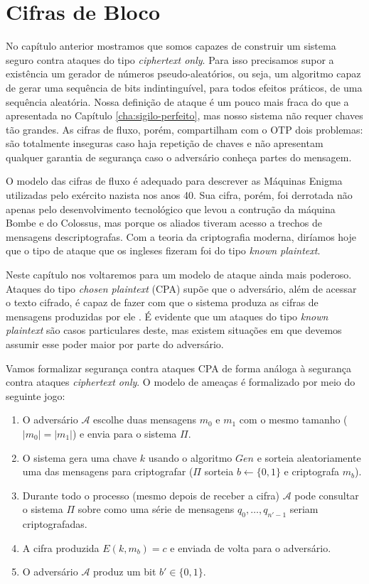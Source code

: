 \chapter{Cifras de Bloco}
\label{cha:cifras-de-bloco}

No capítulo anterior mostramos que somos capazes de construir um sistema seguro contra ataques do tipo {\em ciphertext only}.
Para isso precisamos supor a existência um gerador de números pseudo-aleatórios, ou seja, um algoritmo capaz de gerar uma sequência de bits indintinguível, para todos efeitos práticos, de uma sequência aleatória.
Nossa definição de ataque é um pouco mais fraca do que a apresentada no Capítulo \ref{cha:sigilo-perfeito}, mas nosso sistema não requer chaves tão grandes.
As cifras de fluxo, porém, compartilham com o OTP dois problemas: são totalmente inseguras caso haja repetição de chaves e não apresentam qualquer garantia de segurança caso o adversário conheça partes do mensagem.

O modelo das cifras de fluxo é adequado para descrever as Máquinas Enigma utilizadas pelo exército nazista nos anos 40.
Sua cifra, porém, foi derrotada não apenas pelo desenvolvimento tecnológico que levou a contrução da máquina Bombe e do Colossus, mas porque os aliados tiveram acesso a trechos de mensagens descriptografas.
Com a teoria da criptografia moderna, diríamos hoje que o tipo de ataque que os ingleses fizeram foi do tipo {\em known plaintext}.

Neste capítulo nos voltaremos para um modelo de ataque ainda mais poderoso.
Ataques do tipo {\em chosen plaintext} (CPA) supõe que o adversário, além de acessar o texto cifrado, é capaz de fazer com que o sistema produza as cifras de mensagens produzidas por ele \cite{Bellare97}.
É evidente que um ataques do tipo {\em known plaintext} são casos particulares deste, mas existem situações em que devemos assumir esse poder maior por parte do adversário.

Vamos formalizar segurança contra ataques CPA de forma análoga à segurança contra ataques {\em ciphertext only}.
O modelo de ameaças é formalizado por meio do seguinte jogo:
\begin{enumerate}
\item O adversário $\mathcal{A}$ escolhe duas mensagens $m_0$ e $m_1$ com o mesmo tamanho ($|m_0| = |m_1|$) e envia para o sistema $\Pi$.
\item O sistema gera uma chave $k$ usando o algoritmo $Gen$ e sorteia aleatoriamente uma das mensagens para criptografar ($\Pi$ sorteia $b \leftarrow \{0, 1\}$ e criptografa $m_b$).
\item Durante todo o processo (mesmo depois de receber a cifra) $\mathcal{A}$ pode consultar o sistema $\Pi$ sobre como uma série de mensagens $q_0, \dots, q_{n'-1}$ seriam criptografadas.
\item A cifra produzida $E(k, m_b) = c$ e enviada de volta para o adversário.
\item O adversário $\mathcal{A}$ produz um bit $b' \in \{0,1\}$.
\end{enumerate}

